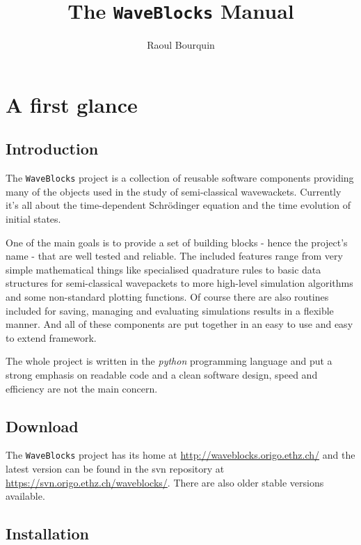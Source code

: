 \documentclass[a4paper,10pt]{report}
\title{The \texttt{WaveBlocks} Manual}
\author{Raoul Bourquin}
\begin{document}
\maketitle


\tableofcontents

\chapter{A first glance}

\section{Introduction}

The \texttt{WaveBlocks} project is a collection of reusable software components
providing many of the objects used in the study of semi-classical wavewackets.
Currently it's all about the time-dependent Schrödinger equation and the time
evolution of initial states.

One of the main goals is to provide a set of building blocks - hence the project's
name - that are well tested and reliable. The included features range from very
simple mathematical things like specialised quadrature rules to basic data
structures for semi-classical wavepackets to more high-level simulation algorithms
and some non-standard plotting functions. Of course there are also routines
included for saving, managing and evaluating simulations results in a flexible
manner. And all of these components are put together in an easy to use and easy
to extend framework.

The whole project is written in the \emph{python} programming language and put
a strong emphasis on readable code and a clean software design, speed and
efficiency are not the main concern.

\section{Download}

The \texttt{WaveBlocks} project has its home at
\url{http://waveblocks.origo.ethz.ch/}
and the latest version can be found in the svn repository at
\url{https://svn.origo.ethz.ch/waveblocks/}. There are also
older stable versions available.

\section{Installation}
\end{document}
